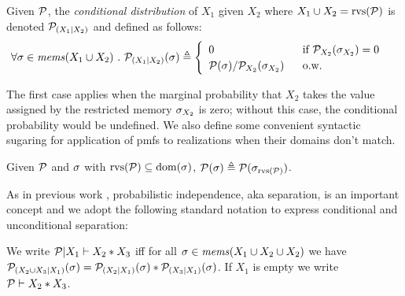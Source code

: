 \begin{definition}
  Given $\mathcal{P}$, the \emph{conditional distribution}
  of $X_1$ given $X_2$ where $X_1 \cup X_2 = \mathrm{rvs}(\mathcal{P})$ 
  is denoted $\mathcal{P}_{({X_1}|{X_2})}$ and defined as follows:
  $$
  \forall \store \in \mems(X_1 \cup X_2)\ .\ 
  \condd{\pmf}{X_1}{X_2}(\store) \defeq
  \begin{cases}
    \begin{array}{ll}
      0 & \text{\ if\ } \margd{\pmf}{X_2}(\store_{X_2}) = 0\\
      \pmf(\store) / \margd{\pmf}{X_2}(\store_{X_2})\ & \text{\ o.w.}
     \end{array}
  \end{cases}
  $$
\end{definition}
The first case applies when the marginal probability that $X_2$ takes
the value assigned by the restricted memory $\sigma_{X_2}$ is zero;
without this case, the conditional probability would be undefined.
We also define some convenient syntactic sugaring for application of
pmfs to realizations when their domains don't match.
\begin{definition}
  Given $\mathcal{P}$ and $\sigma$ with $\mathrm{rvs}(\mathcal{P}) \subseteq \mathrm{dom}(\sigma)$,
  $\mathcal{P}(\sigma) \triangleq \mathcal{P}(\sigma_{\mathrm{rvs}(\mathcal{P})})$.
\end{definition}
As in previous work \cite{darais2019language,barthe2019probabilistic,skalka-near-ppdp24,li2023lilac}, 
probabilistic independence, aka separation, is an important concept and we adopt the
following standard notation to express conditional and unconditional separation:
\begin{definition}
  \label{def-condsep}
  We write $\mathcal{P}|X_1 \vdash X_2 * X_3$ iff for all $\sigma \in \mathit{mems}(X_1 \cup X_2 \cup X_2)$
  we have $\mathcal{P}_{({X_2 \cup X_3}|{X_1})}(\sigma)
  = \mathcal{P}_{({X_2}|{X_1})}(\sigma) * \mathcal{P}_{({X_3}|{X_1})}(\sigma)$. If $X_1$ is empty
  we write $\mathcal{P} \vdash X_2 * X_3$.
\end{definition}


